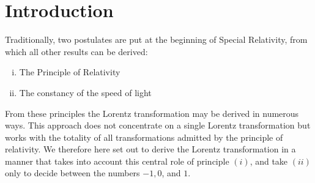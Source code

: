 \section{Introduction}

Traditionally, two postulates are put at the beginning of Special Relativity, from
which all other results can be derived:
\begin{enumerate}[(i)]
	\item The Principle of Relativity
	\item The constancy of the speed of light
\end{enumerate}
From these principles the Lorentz transformation may be derived in numerous ways. This approach does not concentrate on a single Lorentz transformation but works with the totality of all transformations admitted by the principle of relativity. We therefore here set out to derive the Lorentz transformation in a manner that takes into account this central role of principle $ (i) $, and take $ (ii) $ only to decide between the numbers $ -1, 0 $, and $ 1 $.
